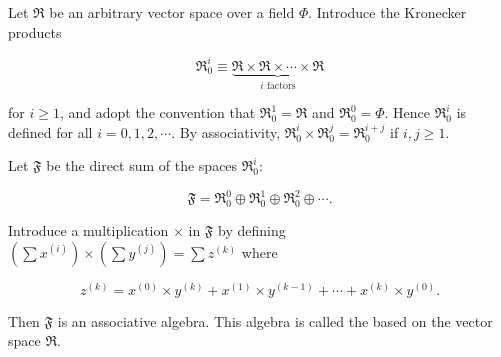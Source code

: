 Let $\Re$ be an arbitrary vector space over a field $\Phi$. Introduce the Kronecker products

$$\Re_0^i \equiv \underbrace{\Re \times \Re \times \cdots \times \Re}_{i\text{ factors}}$$

for $i \geq 1$, and adopt the convention that $\Re_0^1 = \Re$ and $\Re_0^0 = \Phi$. Hence $\Re_0^i$ is defined for all $i = 0, 1, 2, \cdots$. By associativity, $\Re_0^i \times \Re_0^j = \Re_0^{i+j}$ if $i, j \geq 1$.

Let $\mathfrak{F}$ be the direct sum of the spaces $\Re_0^i$:

$$\mathfrak{F} = \Re_0^0 \oplus \Re_0^1 \oplus \Re_0^2 \oplus \cdots.$$

Introduce a multiplication $\times$ in $\mathfrak{F}$ by defining $(\sum x^{(i)}) \times (\sum y^{(j)}) = \sum z^{(k)}$ where

$$z^{(k)} = x^{(0)} \times y^{(k)} + x^{(1)} \times y^{(k-1)} + \cdots + x^{(k)} \times y^{(0)}.$$

Then $\mathfrak{F}$ is an associative algebra. This algebra is called the  based on the vector space $\Re$.
